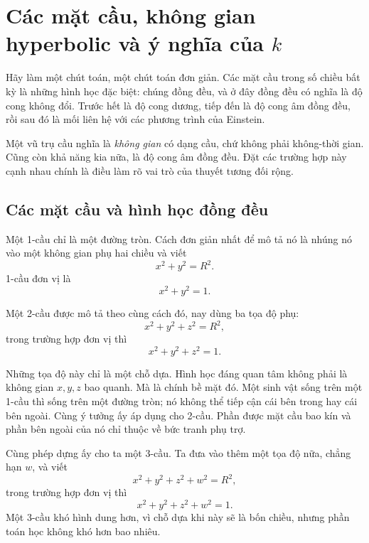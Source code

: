 \chapter{Các mặt cầu, không gian hyperbolic và ý nghĩa của \(k\)}

Hãy làm một chút toán, một chút toán đơn giản. Các mặt cầu trong số chiều bất kỳ là những hình học đặc biệt: chúng đồng đều, và ở đây đồng đều có nghĩa là độ cong không đổi. Trước hết là độ cong dương, tiếp đến là độ cong âm đồng đều, rồi sau đó là mối liên hệ với các phương trình của Einstein.

Một vũ trụ cầu nghĩa là \emph{không gian} có dạng cầu, chứ không phải không-thời gian. Cũng còn khả năng kia nữa, là độ cong âm đồng đều. Đặt các trường hợp này cạnh nhau chính là điều làm rõ vai trò của thuyết tương đối rộng.

\section{Các mặt cầu và hình học đồng đều}

Một 1-cầu chỉ là một đường tròn. Cách đơn giản nhất để mô tả nó là nhúng nó vào một không gian phụ hai chiều và viết
\begin{equation}
x^2+y^2=R^2.
\end{equation}
1-cầu đơn vị là
\begin{equation}
x^2+y^2=1.
\end{equation}

Một 2-cầu được mô tả theo cùng cách đó, nay dùng ba tọa độ phụ:
\begin{equation}
x^2+y^2+z^2=R^2,
\end{equation}
trong trường hợp đơn vị thì
\begin{equation}
x^2+y^2+z^2=1.
\end{equation}

Những tọa độ này chỉ là một chỗ dựa. Hình học đáng quan tâm không phải là không gian \(x,y,z\) bao quanh. Mà là chính bề mặt đó. Một sinh vật sống trên một 1-cầu thì sống trên một đường tròn; nó không thể tiếp cận cái bên trong hay cái bên ngoài. Cùng ý tưởng ấy áp dụng cho 2-cầu. Phần được mặt cầu bao kín và phần bên ngoài của nó chỉ thuộc về bức tranh phụ trợ.

Cùng phép dựng ấy cho ta một 3-cầu. Ta đưa vào thêm một tọa độ nữa, chẳng hạn \(w\), và viết
\begin{equation}
x^2+y^2+z^2+w^2=R^2,
\end{equation}
trong trường hợp đơn vị thì
\begin{equation}
x^2+y^2+z^2+w^2=1.
\end{equation}
Một 3-cầu khó hình dung hơn, vì chỗ dựa khi này sẽ là bốn chiều, nhưng phần toán học không khó hơn bao nhiêu.

